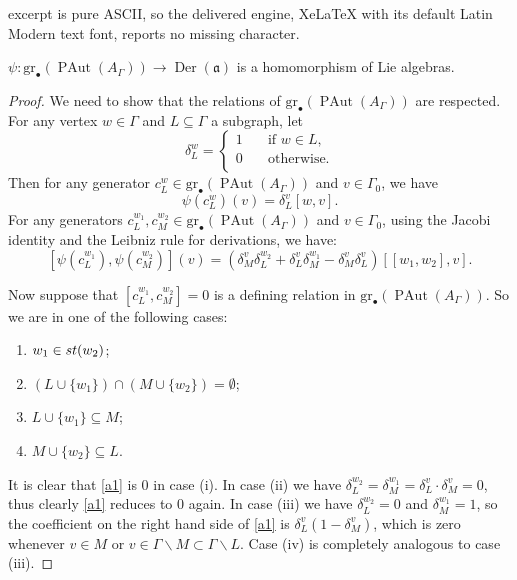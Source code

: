 \documentclass[10pt,a4paper]{amsart}
\newcommand{\Der}{\operatorname {Der}}
\newcommand{\PAut}{\operatorname{PAut}}
\newcommand{\al}{\mathfrak{a}}
\newcommand{\gr}{\mathrm{gr}_\bullet}
\newcommand{\st}{{\rm st}}
\begin{document}
excerpt is pure ASCII, so the delivered engine, XeLaTeX with its default Latin Modern text font, reports no missing character.
\begin{lemma}
 $\psi \colon  \gr(\PAut(A_\Gamma)) \to \Der(\al)$ is a homomorphism of Lie algebras.
\end{lemma}

  \begin{proof}
  We need to show that the relations of $\gr(\PAut(A_\Gamma))$ are respected. For any
  vertex $w \in \Gamma$ and $L \subseteq \Gamma$ a subgraph, let
  \[
\delta_L^w =
     \begin{cases}
       1  &\quad\text{if } w \in L,\\
       0  &\quad\text{otherwise.} \\
     \end{cases}
\]
Then for any generator $c_L^w \in \gr(\PAut(A_\Gamma))$ and $v \in \Gamma_0$, we have \[\psi ( c_L^w) (v) = \delta_L^v [w, v].\]
 For any generators $c_L^{w_1}, c_M^{w_2} \in \gr(\PAut(A_\Gamma))$ and $v \in \Gamma_0$, using the Jacobi identity and the Leibniz rule for derivations, we have:
 \begin{equation} \label{a1}
  [\psi(c_L^{w_1}), \psi(c_M^{w_2})] (v) = (\delta_M^v \delta_L^{w_2} + \delta_L^v \delta_M^{w_1} - \delta_M^v \delta_L^v)[[w_1,w_2],v].
 \end{equation}

 Now suppose that $[c_L^{w_1}, c_M^{w_2}]=0$ is a defining relation in $\gr(\PAut(A_\Gamma))$. So we are in one of the following cases:
 \begin{enumerate}
  \item[(i)] $w_1 \in \st(w_2)$;
  \item[(ii)] $(L \cup \{w_1\}) \cap (M \cup \{w_2\}) = \emptyset$;
  \item[(iii)] $L \cup \{w_1\} \subseteq M$;
  \item[(iv)] $M \cup \{w_2\} \subseteq L$.
 \end{enumerate}
 It is clear that \eqref{a1} is $0$ in case (i). In case (ii) we have $\delta_L^{w_2} = \delta_M^{w_1} = \delta_L^v \cdot \delta_M^v = 0$, thus clearly \eqref{a1} reduces to $0$ again. In case
 (iii) we have $\delta_L^{w_2}=0$ and $\delta_M^{w_1}=1$, so the coefficient on the right hand side of \eqref{a1} is
 $\delta_L^v (1- \delta_M^v)$, which is zero whenever $v \in M$ or $v \in \Gamma \smallsetminus M \subset \Gamma \smallsetminus L$. Case (iv) is completely analogous to case (iii).


\end{proof}
\end{document}
